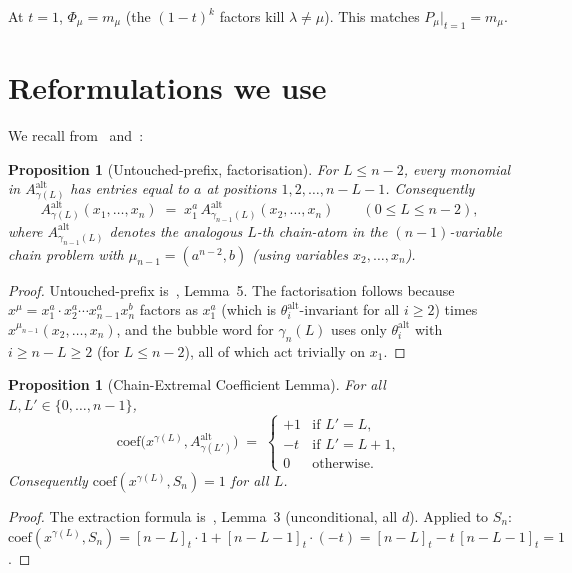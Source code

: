 \documentclass[11pt]{article}
\newtheorem{proposition}[theorem]{Proposition}
\theoremstyle{definition}
\newcommand{\Aalt}{A^{\mathrm{alt}}}
\newcommand{\thalt}{\theta^{\mathrm{alt}}}
\newcommand{\gauss}[1]{[#1]_t}
\begin{document}
At $t = 1$, $\Phi_\mu = m_\mu$ (the $(1-t)^{k}$ factors kill $\lambda \ne \mu$).
This matches $P_\mu|_{t=1} = m_\mu$.

\section{Reformulations we use}

We recall from~\cite{clio-0723} and~\cite{clio-0725}:

\begin{proposition}[Untouched-prefix, factorisation]\label{prop:prefix}
For $L \le n-2$, every monomial in $\Aalt_{\gamma(L)}$ has entries equal to
$a$ at positions $1, 2, \ldots, n-L-1$. Consequently
\[
  \Aalt_{\gamma(L)}(x_1, \ldots, x_n) \;=\; x_1^a\, \Aalt_{\gamma_{n-1}(L)}(x_2, \ldots, x_n)
  \qquad (0 \le L \le n-2),
\]
where $\Aalt_{\gamma_{n-1}(L)}$ denotes the analogous $L$-th chain-atom in
the $(n-1)$-variable chain problem with $\mu_{n-1} = (a^{n-2}, b)$ (using
variables $x_2, \ldots, x_n$).
\end{proposition}
\begin{proof}
Untouched-prefix is~\cite{clio-0725}, Lemma~5. The factorisation follows
because $x^\mu = x_1^a \cdot x_2^a \cdots x_{n-1}^a x_n^b$ factors as
$x_1^a$ (which is $\thalt_i$-invariant for all $i \ge 2$) times
$x^{\mu_{n-1}}(x_2, \ldots, x_n)$, and the bubble word for $\gamma_n(L)$ uses
only $\thalt_i$ with $i \ge n - L \ge 2$ (for $L \le n-2$), all of which act
trivially on $x_1$.
\end{proof}

\begin{proposition}[Chain-Extremal Coefficient Lemma]\label{prop:chainextr}
For all $L, L' \in \{0, \ldots, n-1\}$,
\[
  \mathrm{coef}\bigl(x^{\gamma(L)}, \Aalt_{\gamma(L')}\bigr)
  \;=\;
  \begin{cases}
    +1 & \text{if } L' = L,\\
    -t & \text{if } L' = L + 1,\\
    0  & \text{otherwise}.
  \end{cases}
\]
Consequently $\mathrm{coef}(x^{\gamma(L)}, S_n) = 1$ for all $L$.
\end{proposition}
\begin{proof}
The extraction formula is~\cite{clio-0725}, Lemma~3 (unconditional, all $d$).
Applied to $S_n$: $\mathrm{coef}(x^{\gamma(L)}, S_n) = \gauss{n-L} \cdot 1 + \gauss{n-L-1} \cdot (-t) = \gauss{n-L} - t\,\gauss{n-L-1} = 1$.
\end{proof}
\end{document}
